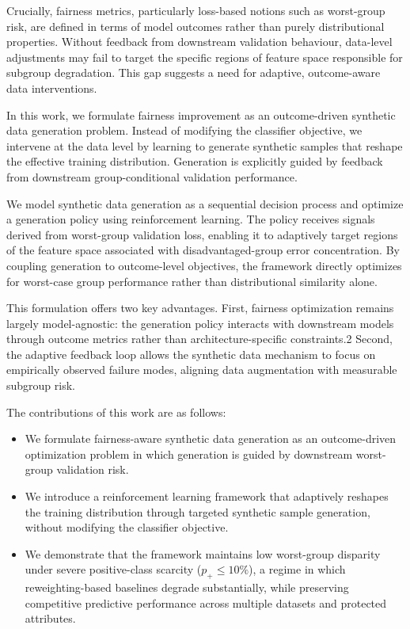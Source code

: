 Crucially, fairness metrics, particularly loss-based notions such as
worst-group risk, are defined in terms of model outcomes rather than purely
distributional properties.
Without feedback from downstream validation behaviour, data-level adjustments
may fail to target the specific regions of feature space responsible for
subgroup degradation.
This gap suggests a need for adaptive, outcome-aware data interventions.

In this work, we formulate fairness improvement as an outcome-driven synthetic
data generation problem.
Instead of modifying the classifier objective, we intervene at the data level
by learning to generate synthetic samples that reshape the effective training
distribution.
Generation is explicitly guided by feedback from downstream group-conditional
validation performance.

We model synthetic data generation as a sequential decision process and
optimize a generation policy using reinforcement learning.
The policy receives signals derived from worst-group validation loss, enabling
it to adaptively target regions of the feature space associated with
disadvantaged-group error concentration.
By coupling generation to outcome-level objectives, the framework directly
optimizes for worst-case group performance rather than distributional
similarity alone.

This formulation offers two key advantages.
First, fairness optimization remains largely model-agnostic: the generation
policy interacts with downstream models through outcome metrics rather than
architecture-specific constraints.2
Second, the adaptive feedback loop allows the synthetic data mechanism to
focus on empirically observed failure modes, aligning data augmentation with
measurable subgroup risk.

The contributions of this work are as follows:
\begin{itemize}
    \item We formulate fairness-aware synthetic data generation as an
    outcome-driven optimization problem in which generation is guided by
    downstream worst-group validation risk.

    \item We introduce a reinforcement learning framework that adaptively
    reshapes the training distribution through targeted synthetic sample
    generation, without modifying the classifier objective.

    \item We demonstrate that the framework maintains low worst-group disparity
    under severe positive-class scarcity ($p_+ \leq 10\%$), a regime in which
    reweighting-based baselines degrade substantially, while preserving
    competitive predictive performance across multiple datasets and protected
    attributes.
\end{itemize}
